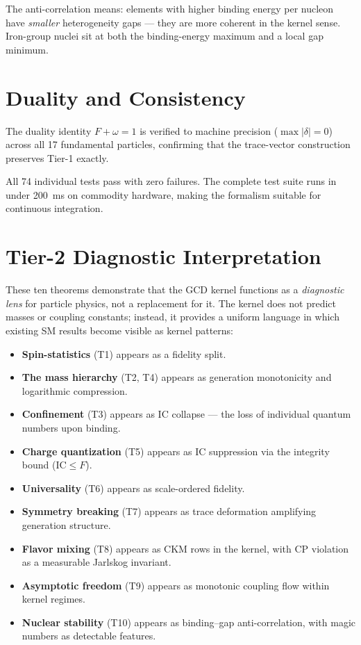 \documentclass[
  aps,
  prd,
  twocolumn,
  superscriptaddress,
  nofootinbib,
  floatfix
]{revtex4-2}
\newcommand{\IC}{\mathrm{IC}}
\begin{document}
The anti-correlation means: elements with higher binding energy
per nucleon have \emph{smaller} heterogeneity gaps --- they are more
coherent in the kernel sense.  Iron-group nuclei sit at both
the binding-energy maximum and a local gap minimum.

\section{Duality and Consistency}\label{sec:duality}

The duality identity $F + \omega = 1$ is verified to machine
precision ($\max|\delta| = 0$) across all 17 fundamental
particles, confirming that the trace-vector construction
preserves Tier-1 exactly.

All 74 individual tests pass with zero failures.  The
complete test suite runs in under 200~ms on commodity
hardware, making the formalism suitable for continuous
integration.

\section{Tier-2 Diagnostic Interpretation}\label{sec:interpretation}

These ten theorems demonstrate that the GCD kernel functions
as a \emph{diagnostic lens} for particle physics, not a
replacement for it.  The kernel does not predict masses or
coupling constants; instead, it provides a uniform language
in which existing SM results become visible as kernel patterns:

\begin{itemize}
\item \textbf{Spin-statistics} (T1) appears as a fidelity split.
\item \textbf{The mass hierarchy} (T2, T4) appears as generation
  monotonicity and logarithmic compression.
\item \textbf{Confinement} (T3) appears as IC collapse --- the
  loss of individual quantum numbers upon binding.
\item \textbf{Charge quantization} (T5) appears as $\IC$
  suppression via the integrity bound ($\IC \leq F$).
\item \textbf{Universality} (T6) appears as scale-ordered fidelity.
\item \textbf{Symmetry breaking} (T7) appears as trace deformation
  amplifying generation structure.
\item \textbf{Flavor mixing} (T8) appears as CKM rows in the
  kernel, with CP violation as a measurable Jarlskog invariant.
\item \textbf{Asymptotic freedom} (T9) appears as monotonic
  coupling flow within kernel regimes.
\item \textbf{Nuclear stability} (T10) appears as binding--gap
  anti-correlation, with magic numbers as detectable features.
\end{itemize}
\end{document}
